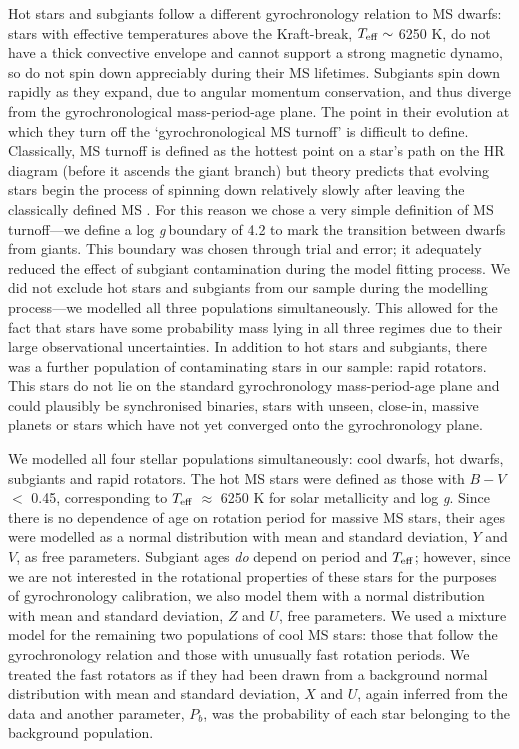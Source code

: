\documentclass[10pt,preprint]{aastex}
\newcommand{\logg}{log \emph{g}}
\newcommand{\teff}{$T_{\rm{eff}}$}
\begin{document}
Hot stars and subgiants follow a different gyrochronology relation to MS dwarfs: stars with effective temperatures above the Kraft-break, $T_{\rm{eff}} \sim$ 6250 K, \citep{Kraft1967} do not have a thick convective envelope and cannot support a strong magnetic dynamo, so do not spin down appreciably during their MS lifetimes.
Subgiants spin down rapidly as they expand, due to angular momentum conservation, and thus diverge from the gyrochronological mass-period-age plane.
The point in their evolution at which they turn off the `gyrochronological MS turnoff' is difficult to define.
Classically, MS turnoff is defined as the hottest point on a star's path on the HR diagram (before it ascends the giant branch) but theory predicts that evolving stars begin the process of spinning down relatively slowly after leaving the classically defined MS \citep{vanSaders2013}.
For this reason we chose a very simple definition of MS turnoff---we define a \logg$~$boundary of 4.2 to mark the transition between dwarfs from giants.
This boundary was chosen through trial and error; it adequately reduced the effect of subgiant contamination during the model fitting process.
We did not exclude hot stars and subgiants from our sample during the modelling process---we modelled all three populations simultaneously.
This allowed for the fact that stars have some probability mass lying in all three regimes due to their large observational uncertainties.
In addition to hot stars and subgiants, there was a further population of contaminating stars in our sample: rapid rotators.
This stars do not lie on the standard gyrochronology mass-period-age plane and could plausibly be synchronised binaries, stars with unseen, close-in, massive planets \citep{Poppenhaeger2014, Beky2014} or stars which have not yet converged onto the gyrochronology plane.

We modelled all four stellar populations simultaneously: cool dwarfs, hot dwarfs, subgiants and rapid rotators.
The hot MS stars were defined as those with $B-V$ $<$ 0.45, corresponding to \teff$~\approx$ 6250 K for solar metallicity and \logg.
Since there is no dependence of age on rotation period for massive MS stars, their ages were modelled as a normal distribution with mean and standard deviation, $Y$ and $V$, as free parameters.
Subgiant ages \emph{do} depend on period and $T_{\rm{eff}}$; however, since we are not interested in the rotational properties of these stars for the purposes of gyrochronology calibration, we also model them with a normal distribution with mean and standard deviation, $Z$ and $U$, free parameters.
We used a mixture model for the remaining two populations of cool MS stars: those that follow the gyrochronology relation and those with unusually fast rotation periods.
We treated the fast rotators as if they had been drawn from a background normal distribution with mean and standard deviation, $X$ and $U$, again inferred from the data and another parameter, $P_b$, was the probability of each star belonging to the background population.
\end{document}
